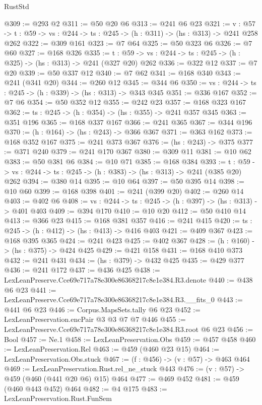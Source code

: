 \begin{lexlean}{RustStd}
\begin{coremodule}
@309 := @293 @2
@311 := @50 @20 @6
@313 := @241 @6 @23
@321 := {v : @57} ->
  {t : @59} -> {vs : @244} -> {ts : @245} -> (h : @311) -> (hs : @313) -> @241 @258 @262
@322 := @309 @161
@323 := @7 @64
@325 := @50 @323 @6
@326 := @7 @60
@327 := @168 @326
@335 := {t : @59} -> {vs : @244} -> {ts : @245} -> (h : @325) -> (hs : @313) -> @241 (@327 @20) @262
@336 := @322 @12
@337 := @7 @20
@339 := @50 @337 @12
@340 := @7 @62
@341 := @168 @340
@343 := @241 (@341 @20)
@344 := @260 @12
@345 := @344 @6
@350 := {vs : @244} -> {ts : @245} -> (h : @339) -> (hs : @313) -> @343 @345
@351 := @336 @167
@352 := @7 @6
@354 := @50 @352 @12
@355 := @242 @23
@357 := @168 @323 @167
@362 := {ts : @245} -> (h : @354) -> (hs : @355) -> @241 @357 @345
@363 := @351 @196
@365 := @168 @337 @167
@366 := @241 @365
@367 := @344 @196
@370 := (h : @164) -> (hs : @243) -> @366 @367
@371 := @363 @162
@373 := @168 @352 @167
@375 := @241 @373 @367
@376 := (hs : @243) -> @375
@377 := @371 @240
@379 := @241 @170 @367
@380 := @309 @11
@381 := @10 @62
@383 := @50 @381 @6
@384 := @10 @71
@385 := @168 @384
@393 := {t : @59} -> {vs : @244} -> {ts : @245} -> (h : @383) -> (hs : @313) -> @241 (@385 @20) @262
@394 := @380 @14
@395 := @10 @64
@397 := @50 @395 @14
@398 := @10 @60
@399 := @168 @398
@401 := @241 (@399 @20)
@402 := @260 @14
@403 := @402 @6
@408 := {vs : @244} -> {ts : @245} -> (h : @397) -> (hs : @313) -> @401 @403
@409 := @394 @170
@410 := @10 @20
@412 := @50 @410 @14
@413 := @366 @23
@415 := @168 @381 @357
@416 := @241 @415
@420 := {ts : @245} -> (h : @412) -> (hs : @413) -> @416 @403
@421 := @409 @367
@423 := @168 @395 @365
@424 := @241 @423
@425 := @402 @367
@428 := (h : @160) -> (hs : @375) -> @424 @425
@429 := @421 @158
@431 := @168 @410 @373
@432 := @241 @431
@434 := (hs : @379) -> @432 @425
@435 := @429 @377
@436 := @241 @172
@437 := @436 @425
@438 := LexLeanPreserve.Cce69e717a78e300e86368217c8e1e384.R3.denote
@440 := @438 @6 @23
@441 := LexLeanPreserve.Cce69e717a78e300e86368217c8e1e384.R3.__fits_0
@443 := @441 @6 @23
@446 := Corpus.MapsSets.tally @6 @23
@452 := LexLeanPreservation.encPair @3 @3 @7 @7 @446
@455 := LexLeanPreserve.Cce69e717a78e300e86368217c8e1e384.R3.root @6 @23
@456 := Bool
@457 := Ne.{1}
@458 := LexLeanPreservation.Obs
@459 := @457 @458
@460 := LexLeanPreservation.Rel
@463 := @459 (@460 @23 @15)
@464 := LexLeanPreservation.Obs.stuck
@467 := (f : @456) -> (v : @57) -> @463 @464
@469 := LexLeanPreservation.Rust.rel_ne_stuck @443
@476 := (v : @57) -> @459 (@460 (@441 @20 @6) @15) @464
@477 := @469 @452
@481 := @459 (@460 @443 @452) @464
@482 := @4 @175
@483 := LexLeanPreservation.Rust.FunSem

\end{coremodule}
\end{lexlean}
